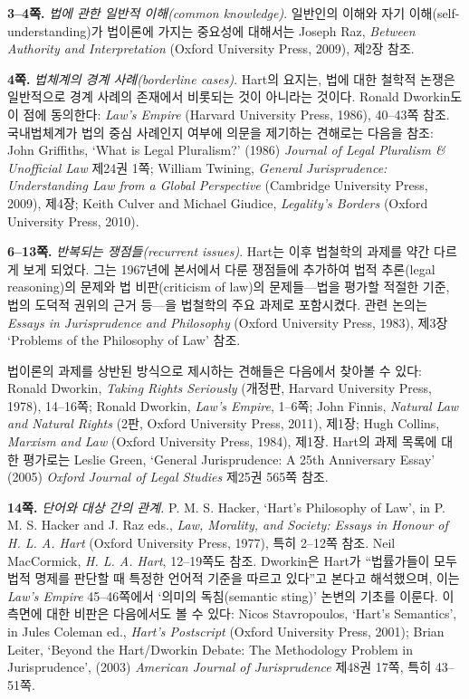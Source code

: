 \documentclass[12pt, oneside]{book}  %
\begin{document}
\textbf{3--4쪽.} \emph{법에 관한 일반적 이해(common knowledge)}.
일반인의 이해와 자기 이해(self-understanding)가 법이론에 가지는 중요성에
대해서는 Joseph Raz, \emph{Between Authority and Interpretation} (Oxford
University Press, 2009), 제2장 참조.

\textbf{4쪽.} \emph{법체계의 경계 사례(borderline cases)}. Hart의
요지는, 법에 대한 철학적 논쟁은 일반적으로 경계 사례의 존재에서 비롯되는
것이 아니라는 것이다. Ronald Dworkin도 이 점에 동의한다: \emph{Law's
Empire} (Harvard University Press, 1986), 40--43쪽 참조. 국내법체계가
법의 중심 사례인지 여부에 의문을 제기하는 견해로는 다음을 참조: John
Griffiths, `What is Legal Pluralism?' (1986) \emph{Journal of Legal
Pluralism \& Unofficial Law} 제24권 1쪽; William Twining, \emph{General
Jurisprudence: Understanding Law from a Global Perspective} (Cambridge
University Press, 2009), 제4장; Keith Culver and Michael Giudice,
\emph{Legality's Borders} (Oxford University Press, 2010).

\textbf{6--13쪽.} \emph{반복되는 쟁점들(recurrent issues)}. Hart는 이후
법철학의 과제를 약간 다르게 보게 되었다. 그는 1967년에 본서에서 다룬
쟁점들에 추가하여 법적 추론(legal reasoning)의 문제와 법 비판(criticism
of law)의 문제들---법을 평가할 적절한 기준, 법의 도덕적 권위의 근거
등---을 법철학의 주요 과제로 포함시켰다. 관련 논의는 \emph{Essays in
Jurisprudence and Philosophy} (Oxford University Press, 1983), 제3장
`Problems of the Philosophy of Law' 참조.

법이론의 과제를 상반된 방식으로 제시하는 견해들은 다음에서 찾아볼 수
있다: Ronald Dworkin, \emph{Taking Rights Seriously} (개정판, Harvard
University Press, 1978), 14--16쪽; Ronald Dworkin, \emph{Law's Empire},
1--6쪽; John Finnis, \emph{Natural Law and Natural Rights} (2판, Oxford
University Press, 2011), 제1장; Hugh Collins, \emph{Marxism and Law}
(Oxford University Press, 1984), 제1장. Hart의 과제 목록에 대한 평가로는
Leslie Green, `General Jurisprudence: A 25th Anniversary Essay' (2005)
\emph{Oxford Journal of Legal Studies} 제25권 565쪽 참조.

\textbf{14쪽.} \emph{단어와 대상 간의 관계.} P. M. S. Hacker, `Hart's
Philosophy of Law', in P. M. S. Hacker and J. Raz eds., \emph{Law,
Morality, and Society: Essays in Honour of H. L. A. Hart} (Oxford
University Press, 1977), 특히 2--12쪽 참조. Neil MacCormick, \emph{H. L.
A. Hart}, 12--19쪽도 참조. Dworkin은 Hart가 ``법률가들이 모두 법적
명제를 판단할 때 특정한 언어적 기준을 따르고 있다''고 본다고 해석했으며,
이는 \emph{Law's Empire} 45--46쪽에서 `의미의 독침(semantic sting)'
논변의 기초를 이룬다. 이 측면에 대한 비판은 다음에서도 볼 수 있다: Nicos
Stavropoulos, `Hart's Semantics', in Jules Coleman ed., \emph{Hart's
Postscript} (Oxford University Press, 2001); Brian Leiter, `Beyond the
Hart/Dworkin Debate: The Methodology Problem in Jurisprudence', (2003)
\emph{American Journal of Jurisprudence} 제48권 17쪽, 특히 43--51쪽.
\end{document}
